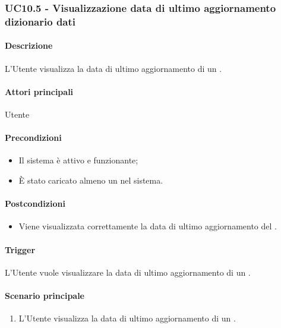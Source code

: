 
\subsubsection{UC10.5 - Visualizzazione data di ultimo aggiornamento dizionario dati}\label{UC10point5}
\paragraph*{Descrizione}
L'Utente visualizza la data di ultimo aggiornamento di un .

\paragraph*{Attori principali}
Utente

\paragraph*{Precondizioni}
\begin{itemize}
  \item Il sistema è attivo e funzionante;
  \item È stato caricato almeno un  nel sistema. 
\end{itemize}

\paragraph*{Postcondizioni}
\begin{itemize}
  \item Viene visualizzata correttamente la data di ultimo aggiornamento del .
\end{itemize}

\paragraph*{Trigger}
L'Utente vuole visualizzare la data di ultimo aggiornamento di un .

\paragraph*{Scenario principale}
\begin{enumerate}
  \item L'Utente visualizza la data di ultimo aggiornamento di un .
\end{enumerate}